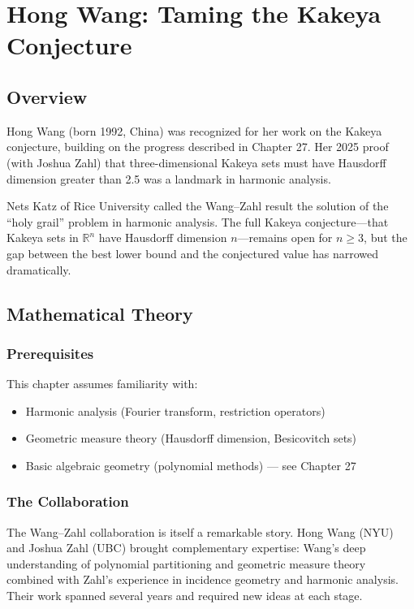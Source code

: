 \let\LocalMacro\relax

\chapter{Hong Wang: Taming the Kakeya Conjecture}

\section{Overview}
Hong Wang (born 1992, China) was recognized for her work on the Kakeya conjecture, building on the progress described in Chapter 27. Her 2025 proof (with Joshua Zahl) that three-dimensional Kakeya sets must have Hausdorff dimension greater than 2.5 was a landmark in harmonic analysis.

\begin{historicalbox}
Nets Katz of Rice University called the Wang--Zahl result the solution of the ``holy grail'' problem in harmonic analysis. The full Kakeya conjecture---that Kakeya sets in $\mathbb{R}^n$ have Hausdorff dimension $n$---remains open for $n \geq 3$, but the gap between the best lower bound and the conjectured value has narrowed dramatically.
\end{historicalbox}


\section{Mathematical Theory}

\subsection{Prerequisites}
This chapter assumes familiarity with:
\begin{itemize}
\item Harmonic analysis (Fourier transform, restriction operators)
\item Geometric measure theory (Hausdorff dimension, Besicovitch sets)
\item Basic algebraic geometry (polynomial methods) --- see Chapter 27
\end{itemize}

\subsection{The Collaboration}

The Wang--Zahl collaboration is itself a remarkable story. Hong Wang (NYU) and Joshua Zahl (UBC) brought complementary expertise: Wang's deep understanding of polynomial partitioning and geometric measure theory combined with Zahl's experience in incidence geometry and harmonic analysis. Their work spanned several years and required new ideas at each stage.

